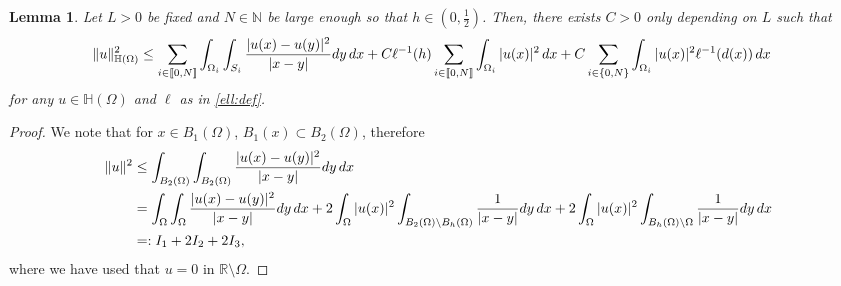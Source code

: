 \documentclass[11 pt]{article}
\newcommand\inter[1]{\llbracket #1\rrbracket}
\newtheorem{lemma}[theorem]{Lemma}
\numberwithin{equation}{section}
\def\R{\mathbb{R}}
\begin{document}
\begin{lemma}\label{lem:localization_enorm}
Let $L>0$ be fixed and $N\in\mathbb N$ be large enough so that $h\in(0,\frac{1}{2})$. Then, there exists $C>0$ only depending on $L$ such that
%
   \begin{align*}\notag
    \|u\|^2_{\mathbb H(\Omega)} &\leq \sum_{i\in\inter{0,N}}\int_{\Omega_i}\int_{S_i}\frac{|u(x)-u(y)|^2}{|x-y|}dy\,dx+C\ell^{-1}(h)\sum_{i\in\inter{0,N}}\int_{\Omega_i}|u(x)|^2\,dx +C\sum_{i\in\{0,N\}}\int_{\Omega_i}|u(x)|^2\ell^{-1}(d(x))\,dx
\end{align*}
%
for any $u\in \mathbb{H}(\Omega)$ and $\ell$ as in \eqref{ell:def}.
\end{lemma}
\begin{proof}
We note that for $x\in B_1(\Omega)$, $B_1(x)\subset B_2(\Omega)$, therefore
%
\begin{align}\notag
    \|u\|^2&\leq \int_{B_2(\Omega)}\int_{B_2(\Omega)}\frac{|u(x)-u(y)|^2}{|x-y|}dy\, dx\\ \notag
    &=\int_{\Omega}\int_{\Omega}\frac{|u(x)-u(y)|^2}{|x-y|}dy\,dx+2\int_{\Omega}|u(x)|^2\int_{B_2(\Omega)\setminus B_h(\Omega)}\frac{1}{|x-y|}dy\,dx+2\int_{\Omega}|u(x)|^2\int_{B_h(\Omega)\setminus \Omega}\frac{1}{|x-y|}dy\,dx\\ &=: I_1+2I_2+2I_3,\label{eq:part_init}
\end{align}
%
where we have used that $u=0$ in $\R\setminus \Omega$. 


\end{proof}
\end{document}
